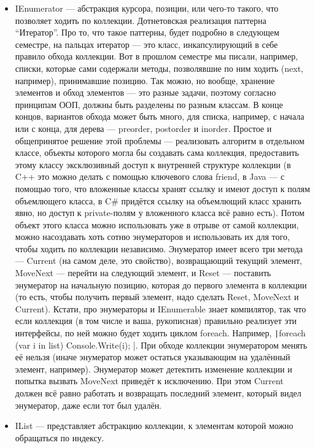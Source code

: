 \documentclass[a5paper]{article}
\begin{document}
\begin{itemize}
    \item IEnumerator --- абстракция курсора, позиции, или чего-то такого, что позволяет ходить по коллекции. Дотнетовская реализация паттерна ``Итератор''. Про то, что такое паттерны, будет подробно в следующем семестре, на пальцах итератор --- это класс, инкапсулирующий в себе правило обхода коллекции. Вот в прошлом семестре мы писали, например, списки, которые сами содержали методы, позволявшие по ним ходить (next, например), принимавшие позицию. Так можно, но вообще, хранение элементов и обход элементов --- это разные задачи, поэтому согласно принципам ООП, должны быть разделены по разным классам. В конце концов, вариантов обхода может быть много, для списка, например, с начала или с конца, для дерева --- preorder, postorder и inorder. Простое и общепринятое решение этой проблемы --- реализовать алгоритм в отдельном классе, объекты которого могла бы создавать сама коллекция, предоставить этому классу эксклюзивный доступ к внутренней структуре коллекции (в C++ это можно делать с помощью ключевого слова friend, в Java --- с помощью того, что вложенные классы хранят ссылку и имеют доступ к полям объемлющего класса, в C\# придётся ссылку на объемлющий класс хранить явно, но доступ к private-полям у вложенного класса всё равно есть). Потом объект этого класса можно использовать уже в отрыве от самой коллекции, можно насоздавать хоть сотню энумераторов и использовать их для того, чтобы ходить по коллекции независимо. Энумератор имеет всего три метода --- Current (на самом деле, это свойство), возвращающий текущий элемент, MoveNext --- перейти на следующий элемент, и Reset --- поставить энумератор на начальную позицию, которая до первого элемента в коллекции (то есть, чтобы получить первый элемент, надо сделать Reset, MoveNext и Current). Кстати, про энумераторы и IEnumerable знает компилятор, так что если коллекция (в том числе и ваша, рукописная) правильно реализует эти интерфейсы, по ней можно будет ходить циклом foreach. Например, \texttt|foreach (var i in list) { Console.Write(i); }|. При обходе коллекции энумератором менять её нельзя (иначе энумератор может остаться указывающим на удалённый элемент, например). Энумератор может детектить изменение коллекции и попытка вызвать MoveNext приведёт к исключению. При этом Current должен всё равно работать и возвращать последний элемент, который видел энумератор, даже если тот был удалён.
    \item IList --- представляет абстракцию коллекции, к элементам которой можно обращаться по индексу.
\end{itemize}
\end{document}

